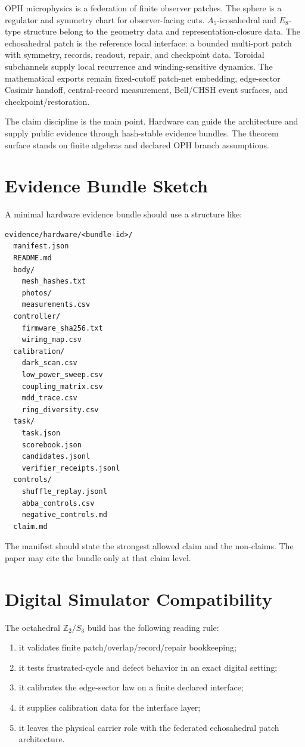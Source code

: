 \documentclass[11pt]{article}
\theoremstyle{remark}
\theoremstyle{plain}
\begin{document}
OPH microphysics is a federation of finite observer patches. The sphere is a regulator and
symmetry chart for observer-facing cuts. \(A_5\)-icosahedral and \(E_8\)-type structure belong to
the geometry data and representation-closure data. The echosahedral patch is the reference local
interface: a bounded multi-port patch with symmetry, records, readout, repair, and checkpoint
data. Toroidal subchannels supply local recurrence and winding-sensitive dynamics. The mathematical
exports remain fixed-cutoff patch-net embedding, edge-sector Casimir handoff, central-record
measurement, Bell/CHSH event surfaces, and checkpoint/restoration.

The claim discipline is the main point. Hardware can guide the architecture and supply public
evidence through hash-stable evidence bundles. The theorem surface stands on finite algebras and
declared OPH branch assumptions.

\appendix

\section{Evidence Bundle Sketch}

A minimal hardware evidence bundle should use a structure like:
\begin{verbatim}
evidence/hardware/<bundle-id>/
  manifest.json
  README.md
  body/
    mesh_hashes.txt
    photos/
    measurements.csv
  controller/
    firmware_sha256.txt
    wiring_map.csv
  calibration/
    dark_scan.csv
    low_power_sweep.csv
    coupling_matrix.csv
    mdd_trace.csv
    ring_diversity.csv
  task/
    task.json
    scorebook.json
    candidates.jsonl
    verifier_receipts.jsonl
  controls/
    shuffle_replay.jsonl
    abba_controls.csv
    negative_controls.md
  claim.md
\end{verbatim}

The manifest should state the strongest allowed claim and the non-claims. The paper may cite the
bundle only at that claim level.

\section{Digital Simulator Compatibility}

The octahedral \(\mathbb Z_2/S_3\) build has the following reading rule:
\begin{enumerate}[leftmargin=2em]
\item it validates finite patch/overlap/record/repair bookkeeping;
\item it tests frustrated-cycle and defect behavior in an exact digital setting;
\item it calibrates the edge-sector law on a finite declared interface;
\item it supplies calibration data for the interface layer;
\item it leaves the physical carrier role with the federated echosahedral patch architecture.
\end{enumerate}
\end{document}
